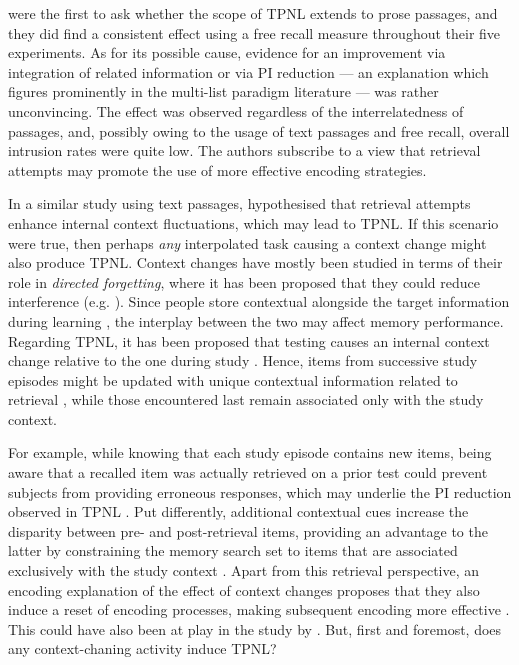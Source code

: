 \documentclass[../main.tex]{subfiles}
\begin{document}
\cite{wissmanInterimTestEffect2011} were the first 
to ask whether the scope 
of TPNL extends to prose passages, and they did find 
a consistent effect 
using a free recall measure throughout their five 
experiments. As for its 
possible cause, evidence for an improvement via 
integration of related 
information or via PI reduction --- an explanation 
which figures prominently 
in the multi-list paradigm literature 
\citep{darleyEffectsPriorFree1971, 
szpunarTestingStudyInsulates2008} --- was rather 
unconvincing. The effect 
was observed regardless of the interrelatedness of 
passages, and, possibly 
owing to the usage of text passages and free recall, 
overall intrusion 
rates were quite low. The authors subscribe to a 
view that retrieval 
attempts may promote the use of more effective 
encoding strategies. 

In a similar study using text passages, 
\cite{divisRetrievalSpeedsContext2014} hypothesised that retrieval attempts 
enhance internal context fluctuations, which may lead to TPNL. If this 
scenario were true, then perhaps \textit{any} interpolated task causing a 
context change might also produce TPNL. Context changes have mostly been 
studied in terms of their role in \textit{directed forgetting}, where it has 
been proposed that they could reduce interference (e.g. 
\citealp{sahakyanContextualChangeAccount2002}). Since people store 
contextual alongside the target information during learning 
\citep{howardDistributedRepresentationTemporal2002,
	tulvingEncodingSpecificityRetrieval1973, 
	mensinkModelInterferenceForgetting1988}, the interplay between the two 
	may affect memory performance. Regarding TPNL, 
	it has been proposed that testing causes an internal context change 
	relative to the one during study \citep{jangContextRetrievalContext2008,
jonkerPuttingRetrievalinducedForgetting2013, 
pastotterRetrievalLearningFacilitates2011}. Hence, items from successive 
study episodes might be updated with unique contextual information related 
to retrieval \citep{karpickeRetrievalBasedLearning2014, 
lehmanEpisodicContextAccount2014}, while those encountered last remain 
associated only with the study context. 

For example, while knowing that each study episode contains new items, being 
aware that a recalled item was actually retrieved on a prior test could 
prevent subjects from providing erroneous responses, which may underlie the 
PI reduction observed in TPNL \citep{szpunarTestingStudyInsulates2008, 
johnsonSourceMonitoring1993}. Put differently, additional contextual cues 
increase the disparity between pre- and post-retrieval items, providing an 
advantage to the latter by constraining the memory search set to items that 
are associated exclusively with the study context 
\citep{szpunarTestingStudyInsulates2008, baumlCriticalRoleRetrieval2013}. 
Apart from this retrieval perspective, an encoding explanation of the effect 
of context changes proposes that they also induce a reset of encoding 
processes, making subsequent encoding more effective 
\citep{pastotterRetrievalLearningFacilitates2011}. This could have also been 
at play in the study by \cite{wissmanInterimTestEffect2011}. But, first and 
foremost, does any context-chaning activity induce TPNL?
\end{document}
